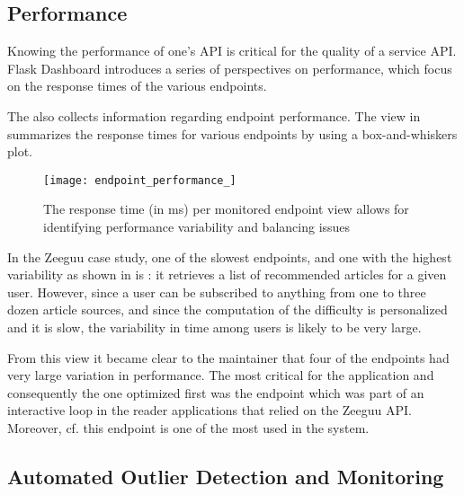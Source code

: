 
\newpage
\subsection{Performance}
\label{sec:perf}

Knowing the performance of one’s API is critical for the quality of a service API. Flask Dashboard introduces a series of perspectives on performance, which focus on the response times of the various endpoints.





The \tool also collects information regarding endpoint performance. The view in  summarizes the response times for various endpoints by using a box-and-whiskers plot. 


 \begin{figure}[!ht]
   \centering
   \texttt{[image: endpoint\_performance\_]}
   \caption{The response time (in ms) per monitored endpoint view allows for identifying performance variability and balancing issues}
   \label{fig:ep}
 \end{figure}



In the Zeeguu case study, one of the slowest endpoints, and one with the highest variability as shown in  is \epFeedItems: it retrieves a list of recommended articles for a given user. However, since a user can be subscribed to anything from one to three dozen article sources, and since the computation of the difficulty is personalized and it is slow, the variability in time among users is likely to be very large. 

  From this view it became clear to the maintainer that four of the endpoints had very large variation in performance.   The most critical for the application and consequently the one optimized first was the \epTranslations endpoint which was part of an interactive loop in the reader applications that relied on the Zeeguu API. Moreover, cf.  this endpoint is one of the most used in the system.



  \subsection{Automated Outlier Detection and Monitoring}
  
